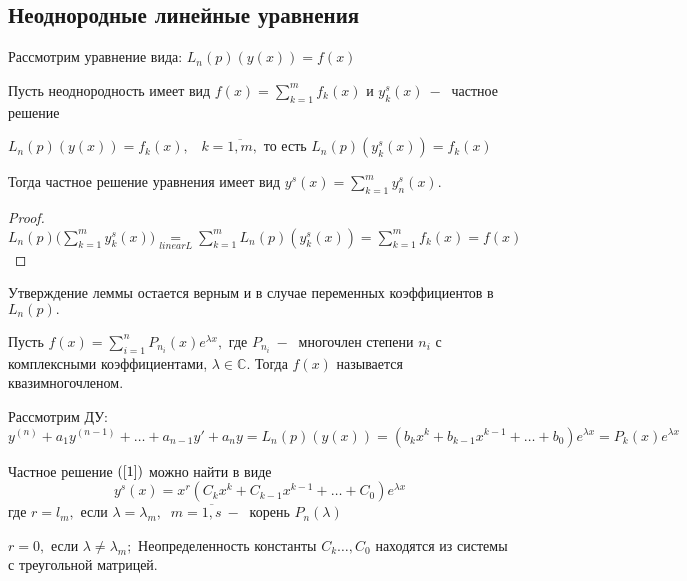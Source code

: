 \subsection{Неоднородные линейные уравнения}
Рассмотрим уравнение вида: $L_n(p)(y(x))=f(x)$
\begin{lemma}
Пусть неоднородность имеет вид $f(x)=\displaystyle\sum_{k=1}^mf_k(x)$ и $y_k^s(x)~-~$ частное решение\par $L_n(p)(y(x))=f_k(x),\;\;\;k=\overline{1,m},$ то есть $L_n(p)(y^s_k(x))=f_k(x)$\par
Тогда частное решение уравнения имеет вид $y^s(x)=\displaystyle\sum_{k=1}^my_n^s(x).$
\end{lemma}
\begin{proof}
$L_n(p)\Big(\displaystyle\sum_{k=1}^my_k^s(x)\Big)\underset{linear L}{=} \displaystyle\sum_{k=1}^mL_n(p)(y^s_k(x))=\displaystyle\sum_{k=1}^mf_k(x)=f(x)$
\end{proof}
\begin{remark}
Утверждение леммы остается верным и в случае переменных коэффициентов в $L_n(p).$
\end{remark}
\begin{definition}
Пусть $f(x)=\displaystyle\sum_{i=1}^nP_{n_i}(x)e^{\lambda x},$ где $P_{n_i}~-~$ многочлен степени $n_i$ с комплексными коэффициентами, $\lambda \in \mathds{C}$. Тогда $f(x)$ называется квазимногочленом.
\end{definition}
Рассмотрим ДУ:
\begin{equation}
    \tag{1}
    \label{1}
    y^{(n)}+a_1y^{(n-1)}+\dots+ a_{n-1} y' + a_ny=L_n(p)(y(x))=(b_kx^k+b_{k-1}x^{k-1}+\dots + b_0)e^{\lambda x}=P_k(x)e^{\lambda x}
\end{equation}
\begin{theorem}
Частное решение $(\ref{1})$ можно найти в виде \begin{equation}
    \tag{2}
    \label{2}
    y^s(x)=x^r(C_kx^k+C_{k-1}x^{k-1}+\dots + C_0)e^{\lambda x}
\end{equation}
где $r=l_m,$ если $\lambda=\lambda_m,\;\;m=\overline{1,s}~-~$ корень $P_n(\lambda)$\par
$r=0,$ если $\lambda\neq \lambda_m;$ Неопределенность константы $C_k\dots,C_0$ находятся из системы с треугольной матрицей.
\end{theorem}
